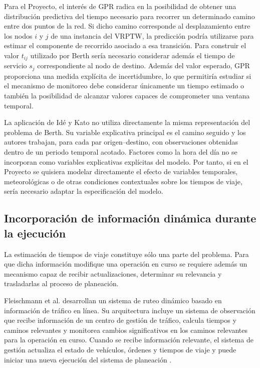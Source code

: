 \documentclass[11pt]{article}
\begin{document}
Para el Proyecto, el interés de GPR radica en la posibilidad de obtener una
distribución predictiva del tiempo necesario para recorrer un determinado camino
entre dos puntos de la red. Si dicho camino corresponde al desplazamiento entre los
nodos \(i\) y \(j\) de una instancia del VRPTW, la predicción podría utilizarse para
estimar el componente de recorrido asociado a esa transición. Para construir el valor
\(t_{ij}\) utilizado por Berth sería necesario considerar además el tiempo de servicio
\(s_j\) correspondiente al nodo de destino. Además del valor esperado, GPR
proporciona una medida explícita de incertidumbre, lo que permitiría estudiar si el
mecanismo de monitoreo debe considerar únicamente un tiempo estimado o también la
posibilidad de alcanzar valores capaces de comprometer una ventana temporal.

La aplicación de Idé y Kato no utiliza directamente la misma representación del
problema de Berth. Su variable explicativa principal es el camino seguido y los autores
trabajan, para cada par origen--destino, con observaciones obtenidas dentro de un
periodo temporal acotado. Factores como la hora del día no se incorporan como
variables explicativas explícitas del modelo. Por tanto, si en el Proyecto se quisiera
modelar directamente el efecto de variables temporales, meteorológicas o de otras
condiciones contextuales sobre los tiempos de viaje, sería necesario adaptar la
especificación del modelo.

\subsection{Incorporación de información dinámica durante la ejecución}

La estimación de tiempos de viaje constituye sólo una parte del problema. Para que dicha
información modifique una operación en curso se requiere además un mecanismo capaz de recibir
actualizaciones, determinar su relevancia y trasladarlas al proceso de planeación.

Fleischmann et al. desarrollan un sistema de ruteo dinámico basado en información de tráfico
en línea. Su arquitectura incluye un sistema de observación que recibe información de un centro
de gestión de tráfico, calcula tiempos y caminos relevantes y monitorea cambios significativos en
los caminos relevantes para la operación en curso. Cuando se recibe información relevante, el
sistema de gestión actualiza el estado de vehículos, órdenes y tiempos de viaje y puede iniciar una
nueva ejecución del sistema de planeación \parencite{fleischmann_gnutzmann_sandvoss_2004}.
\end{document}
